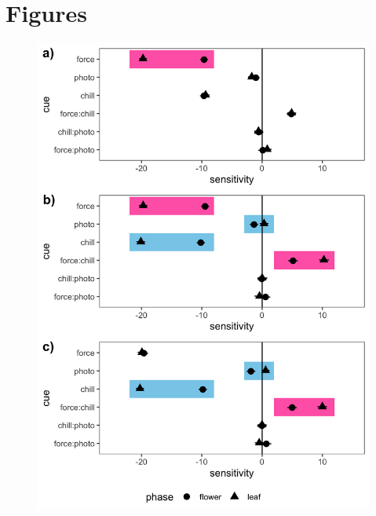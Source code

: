 \documentclass[11pt]{article}
\begin{document}
\section*{Figures}
\begin{figure}[h!]
    \centering
         \includegraphics[width=.8\textwidth]{..//Plots/Flobuds_manuscript_figs/simulations.png}

\end{figure}
\end{document}
